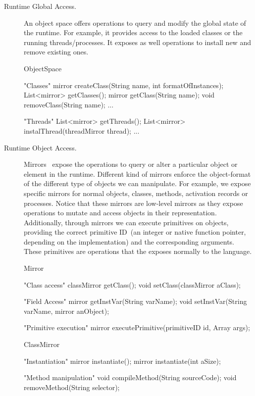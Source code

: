 \begin{description}
\item[Runtime Global Access.] An object space offers operations to query and modify the global state of the runtime. For example, it provides access to the loaded classes or the running threads/processes. It exposes as well operations to install new and remove existing ones.

\begin{code}
ObjectSpace {
    "Classes"
    mirror createClass(String name, int formatOfInstances);
    List<mirror> getClasses();
    mirror getClass(String name);
    void removeClass(String name);
    ...

    "Threads"
    List<mirror> getThreads();
    List<mirror> instalThread(threadMirror thread);
    ...
}
\end{code}

\item[Runtime Object Access.] Mirrors~\cite{Brac04b} expose the operations to query or alter a particular object or element in the runtime. Different kind of mirrors enforce the object-format of the different type of objects we can manipulate. For example, we expose specific mirrors for normal objects, classes, methods, activation records or processes. Notice that these mirrors are low-level mirrors as they expose operations to mutate and access objects in their \VM representation. Additionally, through mirrors we can execute \VM primitives on objects, providing the correct primitive ID~(an integer or native function pointer, depending on the implementation) and the corresponding arguments. These primitives are operations that the \VM exposes normally to the language.

\begin{code}
Mirror {
    "Class access"
    classMirror getClass();
    void setClass(classMirror aClass);

    "Field Access"
    mirror getInstVar(String varName);
    void setInstVar(String varName, mirror anObject);
    
    "Primitive execution"
    mirror executePrimitive(primitiveID id, Array args);
}
\end{code}

\begin{code}
ClassMirror {
    "Instantiation"
    mirror instantiate();
    mirror instantiate(int aSize);

    "Method manipulation"    
    void compileMethod(String sourceCode);
    void removeMethod(String selector);
}
\end{code}

\end{description}

